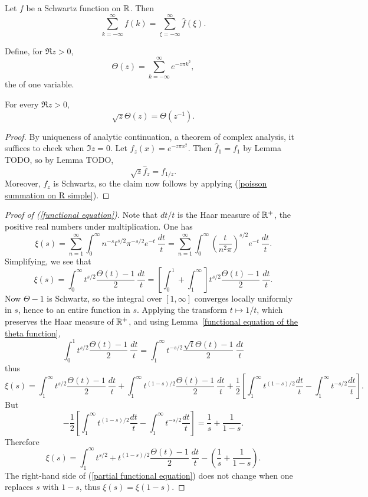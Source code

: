 \begin{corollary}
Let $f$ be a Schwartz function on $\mathbb{R}$. Then
\begin{equation}\label{poisson summation on R simple}
\sum_{k=-\infty}^{\infty} f(k) = \sum_{\xi = -\infty}^{\infty} \hat{f}(\xi).
\end{equation}
\end{corollary}

\begin{definition}
Define, for $\Re z > 0$,
\[\Theta(z) = \sum_{k=-\infty}^{\infty} e^{-z\pi k^{2}},\]
the  of one variable.
\end{definition}

\begin{lemma}\label{functional equation of the theta function}
For every $\Re z > 0$,
\[\sqrt z \Theta(z) = \Theta(z^{-1}).\]
\end{lemma}
\begin{proof}
By uniqueness of analytic continuation, a theorem of complex analysis, it suffices to check when $\Im z = 0$. Let $f_{z}(x) = e^{-z\pi x^{2}}$. Then $\hat{f}_{1} = f_{1}$ by Lemma TODO, so by Lemma TODO,
\[\sqrt z \hat{f}_{z} = f_{1/z}.\]
Moreover, $f_{z}$ is Schwartz, so the claim now follows by applying (\ref{poisson summation on R simple}).
\end{proof}

\begin{proof}[Proof of (\ref{functional equation})]
Note that $dt/t$ is the Haar measure of $\mathbb{R}^+$, the positive real numbers under multiplication. One has
\[\xi(s) = \sum_{n=1}^{\infty} \int_{0}^{\infty} n^{-s} t^{s/2} \pi^{-s/2} e^{-t}~\frac{dt}{t} = \sum_{n=1}^{\infty} \int_{0}^{\infty} {\left(\frac{t}{n^{2}\pi}\right)}^{s/2}e^{-t}~\frac{dt}{t}.\]
Simplifying, we see that
\[\xi(s) = \int_{0}^{\infty} t^{s/2} \frac{\Theta(t) - 1}{2}~\frac{dt}{t} = \left[\int_{0}^{1} + \int_{1}^{\infty} \right]t^{s/2} \frac{\Theta(t) - 1}{2}~\frac{dt}{t}.\]
Now $\Theta - 1$ is Schwartz, so the integral over $[1, \infty]$ converges locally uniformly in $s$, hence to an entire function in $s$.
Applying the transform $t \mapsto 1/t$, which preserves the Haar measure of $\mathbb{R}^+$, and using Lemma~\ref{functional equation of the theta function},
\[\int_{0}^{1} t^{s/2} \frac{\Theta(t) - 1}{2}~\frac{dt}{t} = \int_{1}^{\infty} t^{-s/2} \frac{\sqrt t \Theta(t) - 1}{2}~\frac{dt}{t}\]
thus
\[\xi(s) = \int_{1}^{\infty} t^{s/2} \frac{\Theta(t) - 1}{2}~\frac{dt}{t} + \int_{1}^{\infty} t^{(1-s)/2} \frac{\Theta(t) - 1}{2}~\frac{dt}{t} + \frac{1}{2} \left[\int_{1}^{\infty} t^{(1-s)/2} \frac{dt}{t} - \int_{1}^{\infty} t^{-s/2}\frac{dt}{t} \right].\]
But
\[-\frac{1}{2} \left[\int_{1}^{\infty} t^{(1-s)/2} \frac{dt}{t} - \int_{1}^{\infty} t^{-s/2}\frac{dt}{t} \right] = \frac{1}{s} + \frac{1}{1-s}.\]
Therefore
\begin{equation}\label{partial functional equation}
\xi(s) = \int_{1}^{\infty} t^{s/2} + t^{(1-s)/2}\frac{\Theta(t) - 1}{2} ~\frac{dt}{t} - \left(\frac{1}{s} + \frac{1}{1-s}\right).
\end{equation}
The right-hand side of (\ref{partial functional equation}) does not change when one replaces $s$ with $1-s$, thus $\xi(s) = \xi(1-s)$.
\end{proof}
